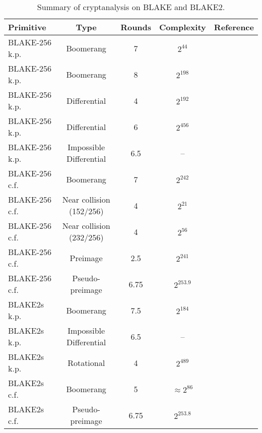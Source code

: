 \documentclass[11pt,notitlepage,a4paper]{article}
\begin{document}
\begin{table}[t]
  \centering
  \caption{Summary of cryptanalysis on BLAKE and BLAKE2.}%
  \label{tab:cryptanalysis}
  \begin{tabular}{lcccc}
    \toprule
    Primitive      & Type         & Rounds & Complexity & Reference \\
    \midrule
    BLAKE-256 k.p. & Boomerang    & 7      & $2^{44}$    & \cite{DBLP:journals/iet-ifs/BaiYWW15,DBLP:conf/cisc/Hao14} \\
    BLAKE-256 k.p. & Boomerang    & 8      & $2^{198}$    & \cite{DBLP:conf/cisc/Hao14} \\
    BLAKE-256 k.p. & Differential & 4      & $2^{192}$    & \cite{DK11} \\
    BLAKE-256 k.p. & Differential & 6      & $2^{456}$    & \cite{DK11} \\
    BLAKE-256 k.p. & Impossible Differential & 6.5      & --    & \cite{DBLP:conf/ctrsa/0001KNWW14} \\
    BLAKE-256 c.f. & Boomerang    & 7      & $2^{242}$    & \cite{DBLP:conf/fse/BiryukovNR11} \\
    BLAKE-256 c.f. & Near collision (152/256) & 4      & $2^{21}$    & \cite{DBLP:conf/cans/SuWWD10} \\
    BLAKE-256 c.f. & Near collision (232/256) & 4      & $2^{56}$    & \cite{DBLP:conf/fse/AumassonGKMM10} \\
    BLAKE-256 c.f. & Preimage & 2.5      & $2^{241}$    & \cite{DBLP:journals/iacr/JiL09} \\
    BLAKE-256 c.f. & Pseudo-preimage & 6.75 & $2^{253.9}$    & \cite{DBLP:conf/crypto/EspitauFK15} \\
    \midrule
    BLAKE2s k.p.   & Boomerang    & 7.5    & $2^{184}$    & \cite{DBLP:conf/cisc/Hao14} \\
    BLAKE2s k.p.   & Impossible Differential & 6.5      & --    & \cite{DBLP:conf/ctrsa/0001KNWW14} \\
    BLAKE2s k.p.   & Rotational   & 4    & $2^{489}$    & \cite{DBLP:conf/ctrsa/0001KNWW14,DBLP:conf/fse/KhovratovichNPS15} \\
    BLAKE2s c.f. & Boomerang & 5 & $\approx 2^{86}$    & \cite{DBLP:conf/fse/BiryukovNR11,DBLP:conf/ctrsa/0001KNWW14} \\
    BLAKE2s c.f. & Pseudo-preimage & 6.75 & $2^{253.8}$    & \cite{DBLP:conf/crypto/EspitauFK15} \\
    \bottomrule
  \end{tabular}
\end{table}
\end{document}
